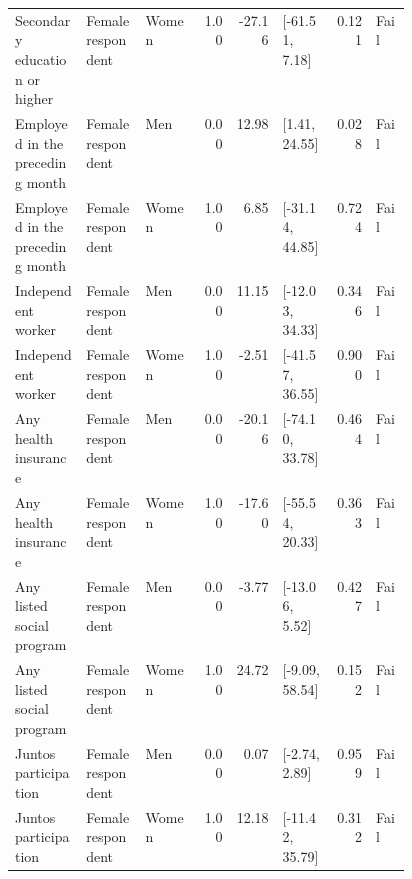\begin{longtable}{@{}p{0.18\linewidth}p{0.15\linewidth}lrrp{0.13\linewidth}rl@{}}
Secondary education or higher & Female respondent & Women & 1.00 & -27.16 & [-61.51, 7.18] & 0.121 & Fail \\
Employed in the preceding month & Female respondent & Men & 0.00 & 12.98 & [1.41, 24.55] & 0.028 & Fail \\
Employed in the preceding month & Female respondent & Women & 1.00 & 6.85 & [-31.14, 44.85] & 0.724 & Fail \\
Independent worker & Female respondent & Men & 0.00 & 11.15 & [-12.03, 34.33] & 0.346 & Fail \\
Independent worker & Female respondent & Women & 1.00 & -2.51 & [-41.57, 36.55] & 0.900 & Fail \\
Any health insurance & Female respondent & Men & 0.00 & -20.16 & [-74.10, 33.78] & 0.464 & Fail \\
Any health insurance & Female respondent & Women & 1.00 & -17.60 & [-55.54, 20.33] & 0.363 & Fail \\
Any listed social program & Female respondent & Men & 0.00 & -3.77 & [-13.06, 5.52] & 0.427 & Fail \\
Any listed social program & Female respondent & Women & 1.00 & 24.72 & [-9.09, 58.54] & 0.152 & Fail \\
Juntos participation & Female respondent & Men & 0.00 & 0.07 & [-2.74, 2.89] & 0.959 & Fail \\
Juntos participation & Female respondent & Women & 1.00 & 12.18 & [-11.42, 35.79] & 0.312 & Fail \\
\end{longtable}
\endgroup
